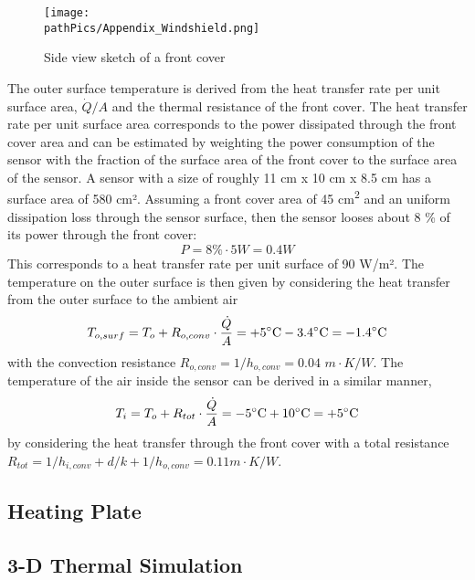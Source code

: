 \begin{figure} [H]
	\centering
	\texttt{[image: \\pathPics/Appendix\_Windshield.png]}
	\caption[PassiveHeating]{Side view sketch of a front cover}
\end{figure}
The outer surface temperature is derived from the heat transfer rate per unit surface area, \(\dot{Q}/A\) and the thermal resistance of the front cover. The heat transfer rate per unit surface area corresponds to the power dissipated through the front cover area and can be estimated by weighting the power consumption of the sensor with the fraction of the surface area of the front cover to the surface area of the sensor. A sensor with a size of roughly 11 cm x 10 cm x 8.5 cm has a surface area of 580 \unit{cm²}. Assuming a front cover area of 45 \unit{cm^2} and an uniform dissipation loss through the sensor surface, then the sensor looses about 8 \unit{\%} of its power through the front cover:
\begin{equation}
P = 8 \% \cdot 5 \unit{W} = 0.4 \unit{W}
\end{equation}
This corresponds to a heat transfer rate per unit surface of 90 \unit{W/m²}. The temperature on the outer surface is then given by considering the heat transfer from the outer surface to the ambient air
\begin{equation}
T_{o,surf} = T_{o} + R_{o,conv}\cdot \frac{\dot{Q}}{A} = +5 \dC - 3.4 \dC = -1.4 \dC
\end{equation}
with the convection resistance \(R_{o,conv} = 1/h_{o,conv} = 0.04 \,\, \unit{m\cdot K/W}\). The temperature of the air inside the sensor can be derived in a similar manner,  
\begin{equation}
T_{i} = T_{o} + R_{tot}\cdot \frac{\dot{Q}}{A} = -5 \dC + 10 \dC = +5 \dC
\end{equation}
by considering the heat transfer through the front cover with a total resistance \(R_{tot} = 1/h_{i,conv}+d/k+1/h_{o,conv} = 0.11 \unit{m\cdot K/W}\).


\subsection{Heating Plate}


\subsection{3-D Thermal Simulation}
